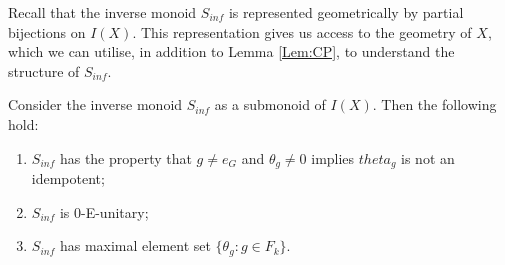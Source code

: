 Recall that the inverse monoid $S_{inf}$ is represented geometrically by partial bijections on $I(X)$. This representation gives us access to the geometry of $X$, which we can utilise, in addition to Lemma \ref{Lem:CP}, to understand the structure of $S_{inf}$. 

\begin{lemma}
Consider the inverse monoid $S_{inf}$ as a submonoid of $I(X)$. Then the following hold:
\begin{enumerate}
\item $S_{inf}$ has the property that $g\not = e_{G}$ and $\theta_{g}\not = 0$ implies $theta_{g}$ is not an idempotent; 
\item $S_{inf}$ is $0$-E-unitary;
\item $S_{inf}$ has maximal element set $\lbrace \theta_{g} : g \in F_{k} \rbrace$.
\end{enumerate}
\end{lemma}
